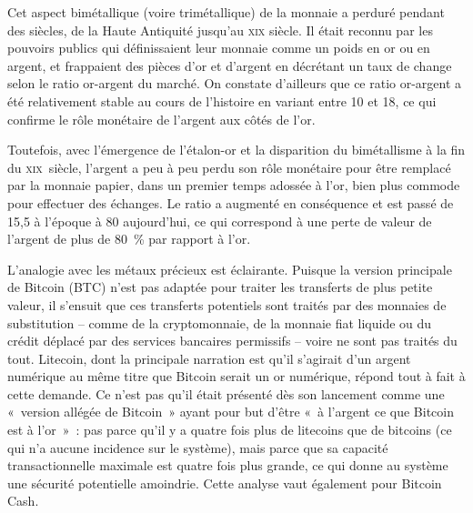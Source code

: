 Cet aspect bimétallique (voire trimétallique) de la monnaie a perduré pendant des siècles, de la Haute Antiquité jusqu'au \textsc{xix}\ieme{} siècle. Il était reconnu par les pouvoirs publics qui définissaient leur monnaie comme un poids en or ou en argent, et frappaient des pièces d'or et d'argent en décrétant un taux de change selon le ratio or-argent du marché. On constate d'ailleurs que ce ratio or-argent a été relativement stable au cours de l'histoire en variant entre 10 et 18, ce qui confirme le rôle monétaire de l'argent aux côtés de l'or.

Toutefois, avec l'émergence de l'étalon-or et la disparition du bimétallisme à la fin du \textsc{xix}\ieme{}~siècle, l'argent a peu à peu perdu son rôle monétaire pour être remplacé par la monnaie papier, dans un premier temps adossée à l'or, bien plus commode pour effectuer des échanges. Le ratio a augmenté en conséquence et est passé de 15,5 à l'époque à 80 aujourd'hui, ce qui correspond à une perte de valeur de l'argent de plus de 80~\% par rapport à l'or.

L'analogie avec les métaux précieux est éclairante. Puisque la version principale de Bitcoin (BTC) n'est pas adaptée pour traiter les transferts de plus petite valeur, il s'ensuit que ces transferts potentiels sont traités par des monnaies de substitution -- comme de la cryptomonnaie, de la monnaie fiat liquide ou du crédit déplacé par des services bancaires permissifs -- voire ne sont pas traités du tout. Litecoin, dont la principale narration est qu'il s'agirait d'un argent numérique au même titre que Bitcoin serait un or numérique, répond tout à fait à cette demande. Ce n'est pas qu'il était présenté dès son lancement comme une «~version allégée de Bitcoin~» ayant pour but d'être «~à l'argent ce que Bitcoin est à l'or~»~: pas parce qu'il y a quatre fois plus de litecoins que de bitcoins (ce qui n'a aucune incidence sur le système), mais parce que sa capacité transactionnelle maximale est quatre fois plus grande, ce qui donne au système une sécurité potentielle amoindrie. Cette analyse vaut également pour Bitcoin Cash.

